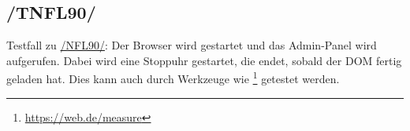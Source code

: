 \subsection*{/TNFL90/}

\label{/TNFL90/} Testfall zu \hyperref[/NFL90/]{/NFL90/}: Der \Gls{Browser} wird gestartet und das \Gls{Admin-Panel} wird aufgerufen.
Dabei wird eine Stoppuhr gestartet, die endet, sobald der \Gls{DOM} fertig geladen hat.
Dies kann auch durch Werkzeuge wie \footnote{\href{https://web.dev/measure}{https://web.de/measure}} getestet werden.